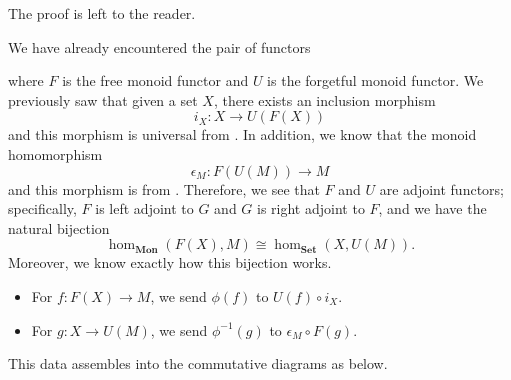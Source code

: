 The proof is left to the reader. 

\begin{example}
    We have already encountered the pair of functors 
    \begin{center}
    \end{center}
    where $F$ is the free monoid functor and $U$ is the forgetful monoid functor.
    We previously saw that given a set $X$, there
    exists an inclusion morphism
    \[
        i_X: X \to U(F(X)) 
    \]
    and this morphism is universal from . 
    In addition, we know that the monoid homomorphism 
    \[
        \epsilon_M: F(U(M)) \to M 
    \]
    and this morphism is from . Therefore, we see that 
    $F$ and $U$ are adjoint functors; specifically, $F$ is left adjoint to $G$ and $G$ 
    is right adjoint to $F$, and we have the natural bijection 
    \[
        \hom_{\textbf{Mon}}(F(X), M) \cong \hom_{\textbf{Set}}(X, U(M)).
    \]
    Moreover, we know exactly how this bijection works. 
    \begin{itemize}
        \item For $f: F(X) \to M$, we send $\phi(f)$ to $U(f) \circ i_X$. 
        \item For $g: X \to U(M)$, we send $\phi^{-1}(g)$ to $\epsilon_M \circ F(g)$. 
    \end{itemize}
    This data assembles into the commutative diagrams as below. 
    \begin{center}
        \hspace{1cm}
    \end{center}

\end{example}

